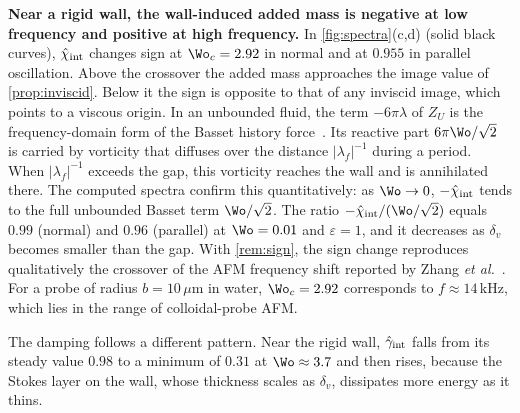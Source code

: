\textbf{Near a rigid wall, the wall-induced added mass is negative at low frequency and positive at high frequency.} In
\cref{fig:spectra}(c,d) (solid black curves), $\hat\chi_{\rm int}$ changes sign at $\Wo_c=2.92$ in normal and at $0.955$ in parallel
oscillation. Above the crossover the added mass approaches the image value of \cref{prop:inviscid}. Below it the sign
is opposite to that of any inviscid image, which points to a viscous origin. In an unbounded fluid, the term
$-6\pi\lambda$ of $Z_U$ is the frequency-domain form of the Basset history force~\cite{maxey1983equation}. Its reactive
part $6\pi\Wo/\sqrt2$ is carried by vorticity that diffuses over the distance $|\lambda_f|^{-1}$ during a period. When
$|\lambda_f|^{-1}$ exceeds the gap, this vorticity reaches the wall and is annihilated there. The computed spectra
confirm this quantitatively: as $\Wo\to0$, $-\hat\chi_{\rm int}$ tends to the full unbounded Basset term $\Wo/\sqrt2$.
The ratio $-\hat\chi_{\rm int}/(\Wo/\sqrt2)$ equals $0.99$ (normal) and $0.96$ (parallel) at $\Wo=0.01$ and
$\varepsilon=1$, and it decreases as $\delta_v$ becomes smaller than the gap.  With
\cref{rem:sign}, the sign change reproduces qualitatively the crossover of the AFM frequency shift reported by Zhang
\emph{et al.}~\cite{zhang2023unsteady}. For a probe of radius $b=10\,\mu$m in water, $\Wo_c=2.92$ corresponds to
$f\approx14$\,kHz, which lies in the range of colloidal-probe AFM.

The damping follows a different pattern. Near the rigid wall, $\hat\gamma_{\rm int}$ falls from its steady value $0.98$
to a minimum of $0.31$ at $\Wo\approx3.7$ and then rises, because the Stokes layer on the wall, whose thickness scales
as $\delta_v$, dissipates more energy as it thins.

